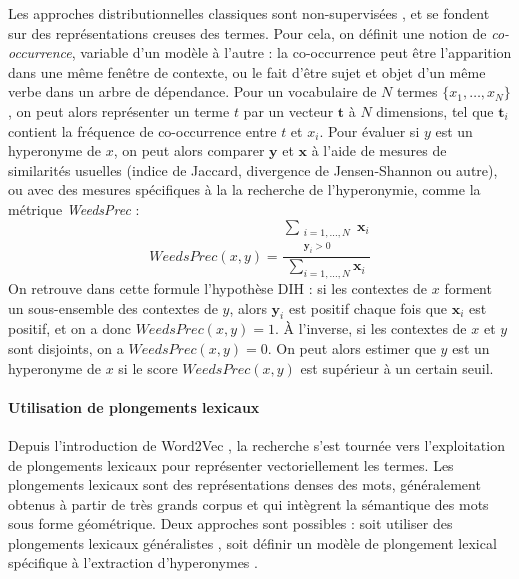 Les approches distributionnelles classiques sont non-supervisées \cite{weeds-etal-2004-characterising}, et se fondent sur des représentations creuses des termes. Pour cela, on définit une notion de \textit{co-occurrence}, variable d'un modèle à l'autre : la co-occurrence peut être l'apparition dans une même fenêtre de contexte, ou le fait d'être sujet et objet d'un même verbe dans un arbre de dépendance. Pour un vocabulaire de $N$ termes $\{x_1, \ldots, x_N\}$, on peut alors représenter un terme $t$ par un vecteur $\textbf{t}$ à $N$ dimensions, tel que $\textbf{t}_i$ contient la fréquence de co-occurrence entre $t$ et $x_i$. Pour évaluer si $y$ est un hyperonyme de $x$, on peut alors comparer $\textbf{y}$ et $\textbf{x}$ à l'aide de mesures de similarités usuelles (indice de Jaccard, divergence de Jensen-Shannon ou autre), ou avec des mesures spécifiques à la la recherche de l'hyperonymie, comme la métrique \textit{WeedsPrec} \cite{weeds-etal-2004-characterising} :
\begin{equation}
    WeedsPrec(x, y) = \frac{\displaystyle \sum_{\substack{i=1, \ldots, N \\ \textbf{y}_i > 0}} \textbf{x}_i}{\displaystyle \sum_{i =1, \ldots, N } \textbf{x}_i}
\end{equation}
On retrouve dans cette formule l'hypothèse DIH : si les contextes de $x$ forment un sous-ensemble des contextes de $y$, alors $\textbf{y}_i$ est positif chaque fois que $\textbf{x}_i$ est positif, et on a donc $WeedsPrec(x, y) = 1$. À l'inverse, si les contextes de $x$ et $y$ sont disjoints, on a $WeedsPrec(x, y) = 0$. On peut alors estimer que $y$ est un hyperonyme de $x$ si le score $WeedsPrec(x, y)$ est supérieur à un certain seuil.

\paragraph{Utilisation de plongements lexicaux}
 
Depuis l'introduction de Word2Vec \cite{mikolov2013distributed}, la recherche s'est tournée vers l'exploitation de plongements lexicaux pour représenter vectoriellement les termes. Les plongements lexicaux sont des représentations denses des mots, généralement obtenus à partir de très grands corpus et qui intègrent la sémantique des mots sous forme géométrique.
Deux approches sont possibles : soit utiliser des plongements lexicaux généralistes \cite{fu2014learning, gupta2016domain, atzori2020fully, pocostales-2016-nuig}, soit définir un modèle de plongement lexical spécifique à l'extraction d'hyperonymes \cite{nguyen-etal-2017-hierarchical, nickel2017poincare, nickel2018learning, yu2015learning, luu-etal-2016-learning, vendrov2015order}. 

